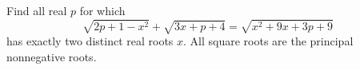 Find all real $p$ for which
\[
\sqrt{2p+1-x^2}+\sqrt{3x+p+4}=\sqrt{x^2+9x+3p+9}
\]
has exactly two distinct real roots $x$. All square roots are the principal nonnegative roots.
